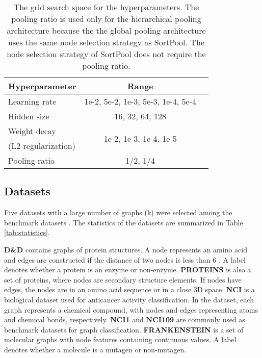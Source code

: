 \documentclass{article}
\begin{document}
\begin{table}
\caption{The grid search space for the hyperparameters. The pooling ratio is used only for the hierarchical pooling architecture because the the global pooling architecture uses the same node selection strategy as SortPool. The node selection strategy of SortPool does not require the pooling ratio.}
\label{tab:hyperparameter}
\vskip 0.15in
\begin{center}
\begin{small}
\begin{tabular}{lcc}
\toprule
\textbf{Hyperparameter} & \textbf{Range} \\

\midrule
Learning rate   & 1e-2, 5e-2, 1e-3, 5e-3, 1e-4, 5e-4 \\
\midrule
Hidden size  & 16, 32, 64, 128 \\
\midrule
Weight decay  & \multirow{2}{*}{1e-2, 1e-3, 1e-4, 1e-5}\\
(L2 regularization) & \\
\midrule
Pooling ratio & 1/2, 1/4 \\
\bottomrule
\end{tabular}
\end{small}
\end{center}
\vskip -0.1in
\end{table}



\subsection{Datasets}
\label{ex:data}
Five datasets with a large number of graphs (k) were selected among the benchmark datasets \cite{KKMMN2016}. The statistics of the datasets are summarized in Table \ref{tab:statistics}.

\textbf{D\&D} \cite{dobson2003distinguishing, shervashidze2011weisfeiler} contains graphs of protein structures. A node represents an amino acid and edges are constructed if the distance of two nodes is less than 6 . A label denotes whether a protein is an enzyme or non-enzyme. \textbf{PROTEINS} \cite{dobson2003distinguishing, borgwardt2005protein} is also a set of proteins, where nodes are secondary structure elements. If nodes have edges, the nodes are in an amino acid sequence or in a close 3D space. \textbf{NCI} \cite{wale2008comparison} is a biological dataset used for anticancer activity classification. In the dataset, each graph represents a  chemical compound, with nodes and edges representing atoms and chemical bonds, respectively. \textbf{NCI1} and \textbf{NCI109} are commonly used as benchmark datasets for graph classification. \textbf{FRANKENSTEIN} \cite{orsini2015graph} is a set of molecular graphs \cite{costa2010fast} with node features containing continuous values. A label denotes whether a molecule is a mutagen or non-mutagen.
\end{document}
